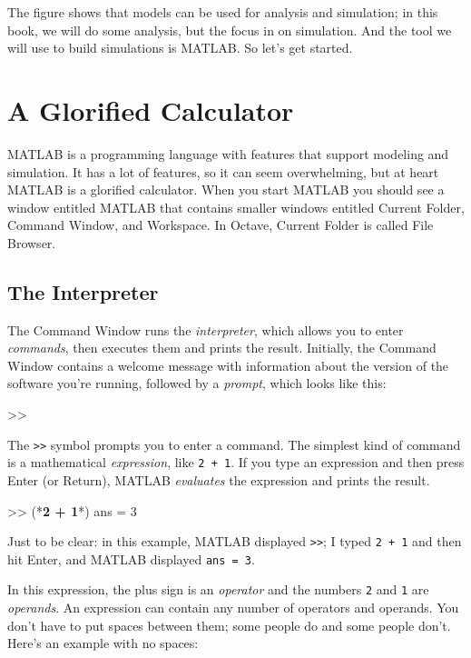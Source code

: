 The figure shows that models can be used for analysis and simulation; in this book, we will do some analysis, but the focus in on simulation.  And the tool we will use to build simulations is MATLAB.  So let's get started.


\section{A Glorified Calculator}
\label{calc}

MATLAB is a programming language with features that support modeling and simulation.  It has a lot of features, so it can seem overwhelming, but at heart MATLAB is a glorified calculator.  When you start MATLAB you should see a window entitled MATLAB that contains smaller windows entitled Current Folder, Command Window, and Workspace.
In Octave, Current Folder is called File Browser.


\subsection{The Interpreter}
The Command Window runs the \emph{interpreter}, which allows you
to enter \emph{commands}, then executes them and prints the
result. 
Initially, the Command Window contains a welcome message with information
about the version of the software you're running, followed by a \emph{prompt}, which looks like this:

\begin{code}
>>
\end{code}

The \lstinline{>>} symbol prompts you to enter a command. 
The simplest kind of command is a mathematical \emph{expression},
like \lstinline{2 + 1}.
If you type an expression and then press Enter (or Return), MATLAB
\emph{evaluates} the expression and prints the result.

\begin{code}
>> (*\textbf{2 + 1}*)
ans = 3
\end{code}

Just to be clear: in this example, MATLAB displayed \lstinline{>>}; I
typed {\tt 2 + 1} and then hit Enter, and MATLAB displayed \lstinline{ans = 3}.


In this expression, the plus sign is an \emph{operator} and the numbers \lstinline{2} and \lstinline{1} are \emph{operands}.
An expression can contain any number of operators and operands.  You
don't have to put spaces between them; some people do and some people
don't. Here's an example with no spaces:

